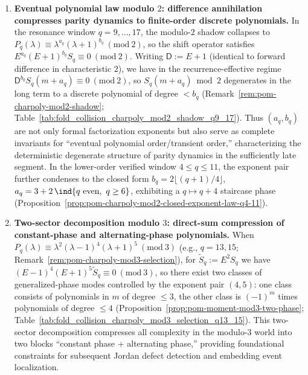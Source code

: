 \begin{enumerate}
  \item \textbf{Eventual polynomial law modulo \texorpdfstring{$2$}{2}: difference annihilation compresses parity dynamics to finite-order discrete polynomials.}
  In the resonance window \(q=9,\dots,17\), the modulo-\(2\) shadow collapses to
  \(P_q(\lambda)\equiv \lambda^{a_q}(\lambda+1)^{b_q}\ (\mathrm{mod}\ 2)\), so the shift operator satisfies
  \(E^{a_q}(E+1)^{b_q}S_q\equiv 0\ (\mathrm{mod}\ 2)\).
  Writing \(\mathsf{D}:=E+1\) (identical to forward difference in characteristic \(2\)), we have in the recurrence-effective regime
  \(\mathsf{D}^{b_q}S_q(m+a_q)\equiv 0\ (\mathrm{mod}\ 2)\), so \(S_q(m+a_q)\bmod 2\) degenerates in the long term to a discrete polynomial of degree \(<b_q\) (Remark~\ref{rem:pom-charpoly-mod2-shadow}; Table~\ref{tab:fold_collision_charpoly_mod2_shadow_q9_17}).
  Thus \((a_q,b_q)\) are not only formal factorization exponents but also serve as complete invariants for ``eventual polynomial order/transient order,'' characterizing the deterministic degenerate structure of parity dynamics in the sufficiently late segment.
  In the lower-order verified window \(4\le q\le 11\), the exponent pair further condenses to the closed form
  \(b_q=2\lfloor (q+1)/4\rfloor\), \(a_q=3+2\,\ind\{q\ \mathrm{even},\ q\ge 6\}\), exhibiting a \(q\mapsto q+4\) staircase phase (Proposition~\ref{prop:pom-charpoly-mod2-closed-exponent-law-q4-11}).

  \item \textbf{Two-sector decomposition modulo \texorpdfstring{$3$}{3}: direct-sum compression of constant-phase and alternating-phase polynomials.}
  When \(P_q(\lambda)\equiv \lambda^2(\lambda-1)^4(\lambda+1)^5\ (\mathrm{mod}\ 3)\) (e.g., \(q=13,15\); Remark~\ref{rem:pom-charpoly-mod3-selection}), for \(\widetilde S_q:=E^2S_q\) we have
  \((E-1)^4(E+1)^5\widetilde S_q\equiv 0\ (\mathrm{mod}\ 3)\), so there exist two classes of generalized-phase modes controlled by the exponent pair \((4,5)\): one class consists of polynomials in \(m\) of degree \(\le 3\), the other class is \((-1)^m\) times polynomials of degree \(\le 4\) (Proposition~\ref{prop:pom-moment-mod3-two-phase}; Table~\ref{tab:fold_collision_charpoly_mod3_selection_q13_15}).
  This two-sector decomposition compresses all complexity in the modulo-\(3\) world into two blocks ``constant phase + alternating phase,'' providing foundational constraints for subsequent Jordan defect detection and embedding event localization.


\end{enumerate}
